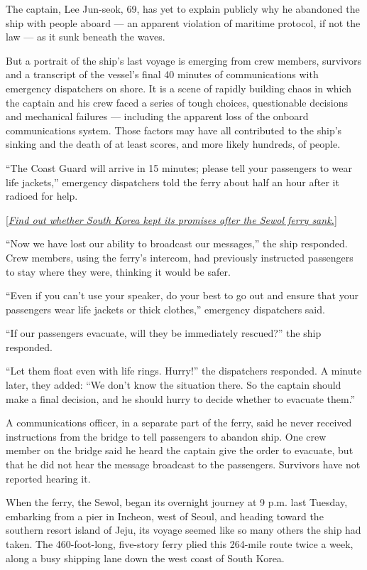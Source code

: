 The captain, Lee Jun-seok, 69, has yet to explain publicly why he
abandoned the ship with people aboard --- an apparent violation of
maritime protocol, if not the law --- as it sunk beneath the waves.

But a portrait of the ship's last voyage is emerging from crew members,
survivors and a transcript of the vessel's final 40 minutes of
communications with emergency dispatchers on shore. It is a scene of
rapidly building chaos in which the captain and his crew faced a series
of tough choices, questionable decisions and mechanical failures ---
including the apparent loss of the onboard communications system. Those
factors may have all contributed to the ship's sinking and the death of
at least scores, and more likely hundreds, of people.

``The Coast Guard will arrive in 15 minutes; please tell your passengers
to wear life jackets,'' emergency dispatchers told the ferry about half
an hour after it radioed for help.

{[}\emph{\href{https://www.nytimes3xbfgragh.onion/2019/06/10/world/asia/sewol-ferry-accident.html?module=inline}{Find
out whether South Korea kept its promises after the Sewol ferry
sank.}}{]}

``Now we have lost our ability to broadcast our messages,'' the ship
responded. Crew members, using the ferry's intercom, had previously
instructed passengers to stay where they were, thinking it would be
safer.

``Even if you can't use your speaker, do your best to go out and ensure
that your passengers wear life jackets or thick clothes,'' emergency
dispatchers said.

``If our passengers evacuate, will they be immediately rescued?'' the
ship responded.

``Let them float even with life rings. Hurry!'' the dispatchers
responded. A minute later, they added: ``We don't know the situation
there. So the captain should make a final decision, and he should hurry
to decide whether to evacuate them.''

A communications officer, in a separate part of the ferry, said he never
received instructions from the bridge to tell passengers to abandon
ship. One crew member on the bridge said he heard the captain give the
order to evacuate, but that he did not hear the message broadcast to the
passengers. Survivors have not reported hearing it.

When the ferry, the Sewol, began its overnight journey at 9 p.m. last
Tuesday, embarking from a pier in Incheon, west of Seoul, and heading
toward the southern resort island of Jeju, its voyage seemed like so
many others the ship had taken. The 460-foot-long, five-story ferry
plied this 264-mile route twice a week, along a busy shipping lane down
the west coast of South Korea.

